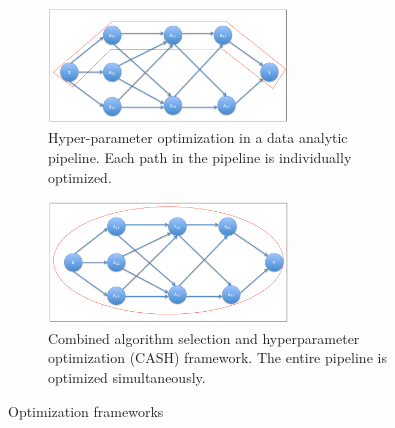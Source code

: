 \begin{figure}[ht!]
\begin{adjustbox}{right}
   \begin{subfigure}{\columnwidth}
   \centering
      \includegraphics[width=0.7\textwidth]{img/EP/HPO}
      \caption{Hyper-parameter optimization in a data analytic pipeline. Each path in the pipeline is individually optimized.}
      \label{fig:HPO}
   \end{subfigure}
\end{adjustbox}

\begin{adjustbox}{right}
   \begin{subfigure}{\columnwidth}
   \centering
      \includegraphics[width=0.7\textwidth]{img/EP/CASH}
      \caption{Combined algorithm selection and hyperparameter optimization (CASH) framework. The entire pipeline is optimized simultaneously.}
      \label{fig:CASH}
   \end{subfigure}
\end{adjustbox}
\caption{Optimization frameworks}\label{fig:frameworks}
\end{figure}




